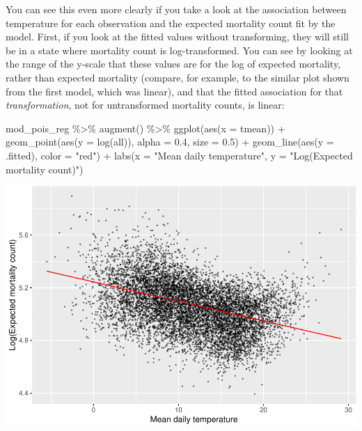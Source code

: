 \documentclass[
]{book}
\newenvironment{Shaded}{\begin{snugshade}}{\end{snugshade}}
\newcommand{\AttributeTok}[1]{\textcolor[rgb]{0.77,0.63,0.00}{#1}}
\newcommand{\FloatTok}[1]{\textcolor[rgb]{0.00,0.00,0.81}{#1}}
\newcommand{\FunctionTok}[1]{\textcolor[rgb]{0.00,0.00,0.00}{#1}}
\newcommand{\NormalTok}[1]{#1}
\newcommand{\SpecialCharTok}[1]{\textcolor[rgb]{0.00,0.00,0.00}{#1}}
\newcommand{\StringTok}[1]{\textcolor[rgb]{0.31,0.60,0.02}{#1}}
\begin{document}
You can see this even more clearly if you take a look at the association between
temperature for each observation and the expected mortality count fit by the
model. First, if you look at the fitted values without transforming, they
will still be in a state where mortality count is log-transformed. You can
see by looking at the range of the y-scale that these values are for the log
of expected mortality, rather than expected mortality (compare, for example, to
the similar plot shown from the first model, which was linear), and that the fitted
association for that \emph{transformation}, not for untransformed mortality counts, is linear:

\begin{Shaded}
\begin{Highlighting}[]
\NormalTok{mod\_pois\_reg }\SpecialCharTok{\%\textgreater{}\%} 
  \FunctionTok{augment}\NormalTok{() }\SpecialCharTok{\%\textgreater{}\%} 
  \FunctionTok{ggplot}\NormalTok{(}\FunctionTok{aes}\NormalTok{(}\AttributeTok{x =}\NormalTok{ tmean)) }\SpecialCharTok{+} 
  \FunctionTok{geom\_point}\NormalTok{(}\FunctionTok{aes}\NormalTok{(}\AttributeTok{y =} \FunctionTok{log}\NormalTok{(all)), }\AttributeTok{alpha =} \FloatTok{0.4}\NormalTok{, }\AttributeTok{size =} \FloatTok{0.5}\NormalTok{) }\SpecialCharTok{+} 
  \FunctionTok{geom\_line}\NormalTok{(}\FunctionTok{aes}\NormalTok{(}\AttributeTok{y =}\NormalTok{ .fitted), }\AttributeTok{color =} \StringTok{"red"}\NormalTok{) }\SpecialCharTok{+} 
  \FunctionTok{labs}\NormalTok{(}\AttributeTok{x =} \StringTok{"Mean daily temperature"}\NormalTok{, }\AttributeTok{y =} \StringTok{"Log(Expected mortality count)"}\NormalTok{)}
\end{Highlighting}
\end{Shaded}

\includegraphics{adv_epi_analysis_files/figure-latex/unnamed-chunk-31-1.pdf}
\end{document}
